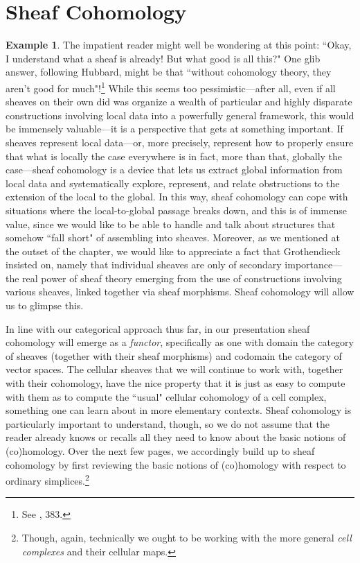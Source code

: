\documentclass[11pt]{book}
\theoremstyle{definition}
\newtheorem{example}{Example}[section]
\theoremstyle{definition}
\theoremstyle{definition}
\theoremstyle{theorem}
\theoremstyle{definition}
\begin{document}
	\section{Sheaf Cohomology}
		\begin{example} 
		The impatient reader might well be wondering at this point: ``Okay, I understand what a sheaf is already! But what good is all this?" One glib answer, following Hubbard, might be that ``without cohomology theory, they aren't good for much"!\footnote{See \cite{hubbard_teichmuller_2006}, 383.} While this seems too pessimistic---after all, even if all sheaves on their own did was organize a wealth of particular and highly disparate constructions involving local data into a powerfully general framework, this would be immensely valuable---it is a perspective that gets at something important. If sheaves represent local data---or, more precisely, represent how to properly ensure that what is locally the case everywhere is in fact, more than that, globally the case---sheaf cohomology is a device that lets us extract global information from local data and systematically explore, represent, and relate obstructions to the extension of the local to the global. In this way, sheaf cohomology can cope with situations where the local-to-global passage breaks down, and this is of immense value, since we would like to be able to handle and talk about structures that somehow ``fall short" of assembling into sheaves. Moreover, as we mentioned at the outset of the chapter, we would like to appreciate a fact that Grothendieck insisted on, namely that individual sheaves are only of secondary importance---the real power of sheaf theory emerging from the use of constructions involving various sheaves, linked together via sheaf morphisms. Sheaf cohomology will allow us to glimpse this. \par 
		In line with our categorical approach thus far, in our presentation sheaf cohomology will emerge as a \textit{functor}, specifically as one with domain the category of sheaves (together with their sheaf morphisms) and codomain the category of vector spaces. The cellular sheaves that we will continue to work with, together with their cohomology, have the nice property that it is just as easy to compute with them as to compute the ``usual" cellular cohomology of a cell complex, something one can learn about in more elementary contexts. Sheaf cohomology is particularly important to understand, though, so we do not assume that the reader already knows or recalls all they need to know about the basic notions of (co)homology. Over the next few pages, we accordingly build up to sheaf cohomology by first reviewing the basic notions of (co)homology with respect to ordinary simplices.\footnote{Though, again, technically we ought to be working with the more general \textit{cell complexes} and their cellular maps.}

\end{example}
\end{document}
